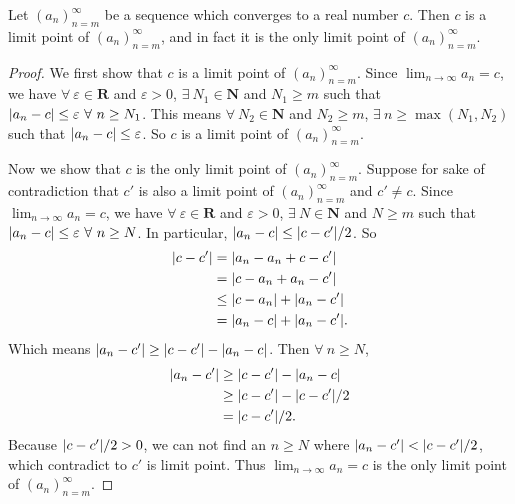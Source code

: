 \setcounter{theorem}{4}
\begin{proposition}\label{6.4.5}
    Let \((a_n)_{n = m}^\infty\) be a sequence which converges to a real number \(c\).
    Then \(c\) is a limit point of \((a_n)_{n = m}^\infty\), and in fact it is the only limit point of \((a_n)_{n = m}^\infty\).
\end{proposition}

\begin{proof}
    We first show that \(c\) is a limit point of \((a_n)_{n = m}^\infty\).
    Since \(\lim_{n \to \infty} a_n = c\), we have \(\forall\ \varepsilon \in \mathbf{R}\) and \(\varepsilon > 0\), \(\exists\ N_1 \in \mathbf{N}\) and \(N_1 \geq m\) such that \(\abs*{a_n - c} \leq \varepsilon \ \forall\ n \geq N_1\).
    This means \(\forall\ N_2 \in \mathbf{N}\) and \(N_2 \geq m\), \(\exists\ n \geq \max(N_1, N_2)\) such that \(\abs*{a_n - c} \leq \varepsilon\).
    So \(c\) is a limit point of \((a_n)_{n = m}^\infty\).

    Now we show that \(c\) is the only limit point of \((a_n)_{n = m}^\infty\).
    Suppose for sake of contradiction that \(c'\) is also a limit point of \((a_n)_{n = m}^\infty\) and \(c' \neq c\).
    Since \(\lim_{n \to \infty} a_n = c\), we have \(\forall\ \varepsilon \in \mathbf{R}\) and \(\varepsilon > 0\), \(\exists\ N \in \mathbf{N}\) and \(N \geq m\) such that \(\abs*{a_n - c} \leq \varepsilon \ \forall\ n \geq N\).
    In particular, \(\abs*{a_n - c} \leq \abs*{c - c'} / 2\).
    So
    \begin{align*}
        \abs*{c - c'} & = \abs*{a_n - a_n + c - c'}           \\
                      & = \abs*{c - a_n + a_n - c'}           \\
                      & \leq \abs*{c - a_n} + \abs*{a_n - c'} \\
                      & = \abs*{a_n - c} + \abs*{a_n - c'}.
    \end{align*}
    Which means \(\abs*{a_n - c'} \geq \abs*{c - c'} - \abs*{a_n - c}\).
    Then \(\forall\ n \geq N\),
    \begin{align*}
        \abs*{a_n - c'} & \geq \abs*{c - c'} - \abs*{a_n - c}    \\
                        & \geq \abs*{c - c'} - \abs*{c - c'} / 2 \\
                        & = \abs*{c - c'} / 2.
    \end{align*}
    Because \(\abs*{c - c'} / 2 > 0\), we can not find an \(n \geq N\) where \(\abs*{a_n - c'} < \abs*{c - c'} / 2\), which contradict to \(c'\) is limit point.
    Thus \(\lim_{n \to \infty} a_n = c\) is the only limit point of \((a_n)_{n = m}^\infty\).
\end{proof}

